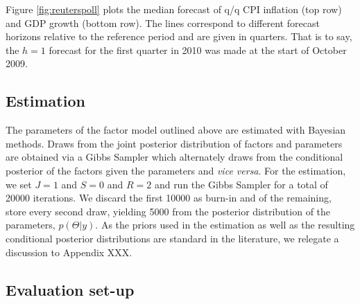 \documentclass[notitlepage,a4paper,12pt]{article}
\begin{document}
Figure \ref{fig:reuterspoll} plots the median forecast of q/q CPI inflation (top row) and GDP growth (bottom row). The lines correspond to different forecast horizons relative to the reference period and are given in quarters. That is to say, the $h=1$ forecast for the first quarter in 2010 was made at the start of October 2009. 
 

\subsection{Estimation}

The parameters of the factor model outlined above are estimated with Bayesian methods. Draws from the joint posterior distribution of factors and parameters are obtained via a Gibbs Sampler which alternately draws from the conditional posterior of the factors given the parameters and \textit{vice versa}. For the estimation, we set $J=1$ and $S=0$ and $R=2$ and run the Gibbs Sampler for a total of 20000 iterations. We discard the first 10000 as burn-in and of the remaining, store every second draw, yielding 5000 from the posterior distribution of the parameters, $p(\Theta|y)$. As the priors used in the estimation as well as the resulting conditional posterior distributions are standard in the literature, we relegate a discussion to Appendix XXX. 

\subsection{Evaluation set-up}
\end{document}
